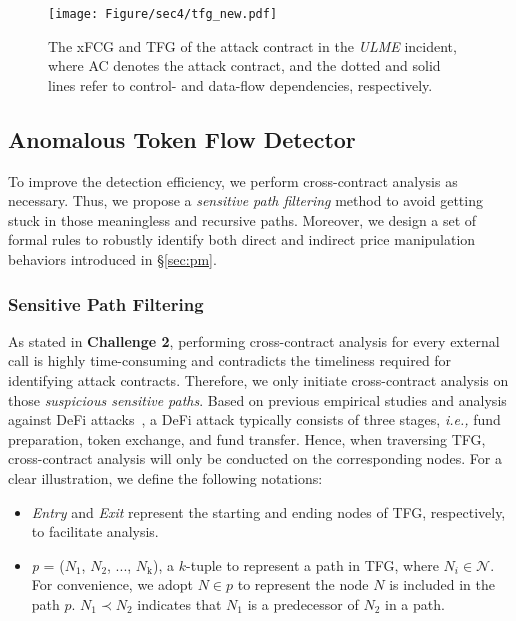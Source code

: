 \begin{figure}[t] 
\centering
\texttt{[image: Figure/sec4/tfg\_new.pdf]} 
\vspace{-0.1in}
\caption{The xFCG and TFG of the attack contract in the \textit{ULME} incident, where AC denotes the attack contract, and the dotted and solid lines refer to control- and data-flow dependencies, respectively.}
\vspace{-0.1in}
\label{fig:tfg4} 
\end{figure}





\subsection{Anomalous Token Flow Detector}
To improve the detection efficiency, we perform cross-contract analysis as necessary. Thus, we propose a \textit{sensitive path filtering} method to avoid getting stuck in those meaningless and recursive paths.
Moreover, we design a set of formal rules to robustly identify both direct and indirect price manipulation behaviors introduced in \S\ref{sec:pm}.



\subsubsection{Sensitive Path Filtering}
\label{sec:spf}
As stated in \textbf{Challenge 2}, performing cross-contract analysis for every external call is highly time-consuming and contradicts the timeliness required for identifying attack contracts. Therefore, we only initiate cross-contract analysis on those \textit{suspicious sensitive paths}.
Based on previous empirical studies and analysis against DeFi attacks~\cite{wu2023defiranger, su2021evil, zhou2023sok}, a DeFi attack typically consists of three stages, \textit{i.e.,} fund preparation, token exchange, and fund transfer. Hence, when traversing TFG, cross-contract analysis will only be conducted on the corresponding nodes.
For a clear illustration, we define the following notations:
\begin{itemize}
    \item \textit{Entry} and \textit{Exit} represent the starting and ending nodes of TFG, respectively, to facilitate analysis.
    \item \textit{p} = ($\textit{N}_{1}$, $\textit{N}_{2}$, ..., $\textit{N}_{\text{k}}$), a $k$-tuple to represent a path in TFG, where $N_{i} \in \mathcal{N}$. For convenience, we adopt $N \in p$ to represent the node $N$ is included in the path $p$. $\textit{N}_{1} \prec \textit{N}_{2}$ indicates that $\textit{N}_{1}$ is a predecessor of $\textit{N}_{2}$ in a path.
\end{itemize}

